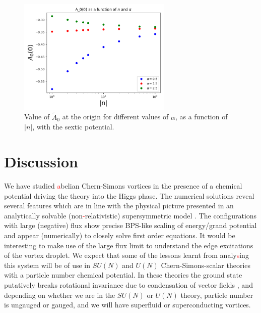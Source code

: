 \begin{figure}[H]
\begin{center}
    \includegraphics[width=2.9in]{Chapter_2_Folder_1912.11321/figures/sixth_order_A0.pdf}     \caption[This figure shows value of $\tilde A_0$ at the origin for different values of $\alpha$, as a function of $|n|$,  
 with the sextic potential.]{{ \small Value of $\tilde A_0$ at the origin for different values of $\alpha$, as a function of $|n|$,  
 with the sextic potential.}} \label{A0sextic}
    \end{center}
\end{figure}
\section{Discussion}
We have studied \textcolor{red}{a}belian Chern-Simons vortices in the presence of a chemical potential driving the theory into the Higgs phase. The numerical solutions reveal several features which are in line with the physical picture presented in an analytically solvable (non\textcolor{red}{-}relativistic) supersymmetric model \cite{Tong:2015xaa, Tong:2003vy}.  The configurations with large (negative) flux show precise BPS-like scaling of energy/grand potential and appear (numerically) to closely solve first order equations.
It would be interesting to make use of the large flux limit to understand the edge excitations of the vortex droplet. We expect that some of the lessons learnt from analy\textcolor{red}{s}ing this system will be of use in $SU(N)$ and $U(N)$ Chern-Simons-scalar theories with a particle number chemical potential. In these theories the ground state putatively breaks rotational invariance due to condensation of vector fields \cite{Kumar:2018nkf}, and depending on whether we are in the $SU(N)$ or $U(N)$ theory, particle number is ungauged or gauged,  and we will have superfluid or superconducting vortices. 



